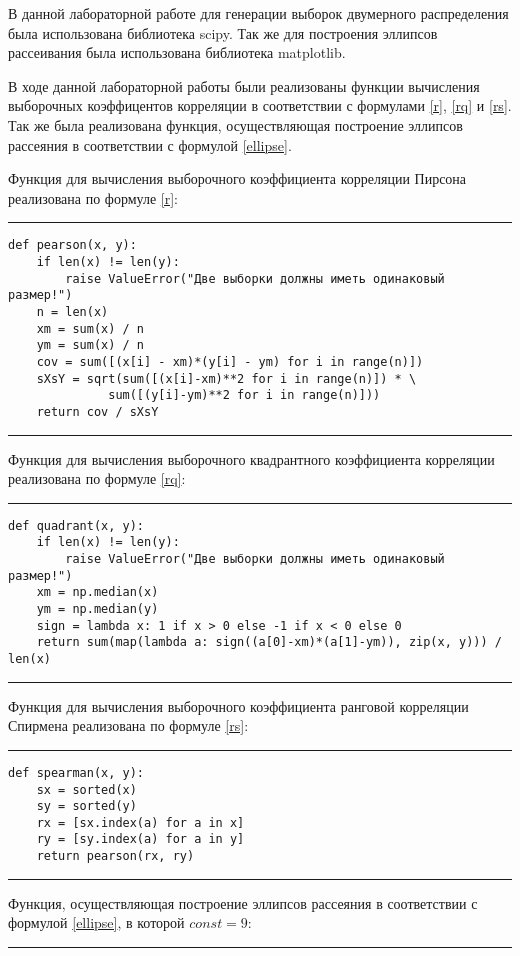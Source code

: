 \documentclass[12pt]{article}
\begin{document}
В данной лабораторной работе для генерации выборок двумерного распределения была использована библиотека scipy. Так же для построения эллипсов рассеивания была использована библиотека matplotlib. 

В ходе данной лабораторной работы были реализованы функции вычисления выборочных коэффицентов корреляции в соответствии с формулами \eqref{r}, \eqref{rq} и \eqref{rs}.  Так же была реализована функция, осуществляющая построение эллипсов рассеяния в соответствии с формулой \eqref{ellipse}.
\vskip 0.4cm
\par Функция для вычисления выборочного коэффициента корреляции Пирсона реализована по формуле \eqref{r}:
\hrule width 16cm height 1pt
\begin{verbatim}
def pearson(x, y):
    if len(x) != len(y):
        raise ValueError("Две выборки должны иметь одинаковый размер!")
    n = len(x)
    xm = sum(x) / n
    ym = sum(x) / n
    cov = sum([(x[i] - xm)*(y[i] - ym) for i in range(n)])
    sXsY = sqrt(sum([(x[i]-xm)**2 for i in range(n)]) * \
              sum([(y[i]-ym)**2 for i in range(n)]))
    return cov / sXsY
\end{verbatim}
\hrule width 16cm height 1pt
\vskip 0.4cm
\par Функция для вычисления выборочного квадрантного коэффициента корреляции реализована по формуле \eqref{rq}:
\hrule width 16cm height 1pt
\begin{verbatim}
def quadrant(x, y):
    if len(x) != len(y):
        raise ValueError("Две выборки должны иметь одинаковый размер!")
    xm = np.median(x)
    ym = np.median(y)
    sign = lambda x: 1 if x > 0 else -1 if x < 0 else 0
    return sum(map(lambda a: sign((a[0]-xm)*(a[1]-ym)), zip(x, y))) / len(x)
\end{verbatim}
\hrule width 16cm height 1pt
\vskip 0.4cm
\par Функция для вычисления выборочного коэффициента ранговой корреляции Спирмена реализована по формуле \eqref{rs}:
\hrule width 16cm height 1pt
\begin{verbatim}
def spearman(x, y):
    sx = sorted(x)
    sy = sorted(y)
    rx = [sx.index(a) for a in x]
    ry = [sy.index(a) for a in y]
    return pearson(rx, ry)
\end{verbatim}
\hrule width 16cm height 1pt
\vskip 0.4cm
\par Функция, осуществляющая построение эллипсов рассеяния в соответствии с формулой \eqref{ellipse}, в которой $const=9$:
\vskip 0.3cm
\hrule width 16cm height 1pt
\end{document}

